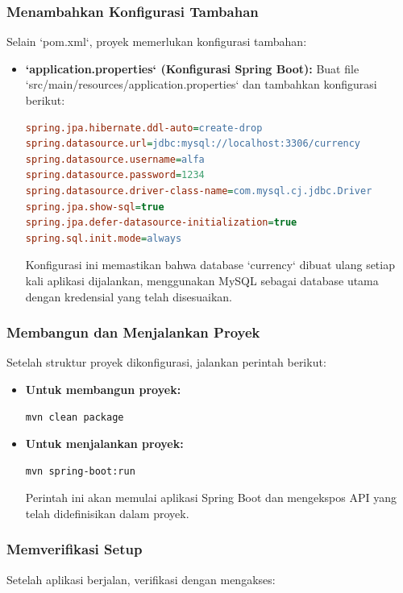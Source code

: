 \subsubsection{Menambahkan Konfigurasi Tambahan}
Selain `pom.xml`, proyek memerlukan konfigurasi tambahan:

\begin{itemize}
\item \textbf{`application.properties` (Konfigurasi Spring Boot):}
Buat file `src/main/resources/application.properties` dan tambahkan konfigurasi berikut:

\begin{lstlisting}[language=ini]
spring.jpa.hibernate.ddl-auto=create-drop
spring.datasource.url=jdbc:mysql://localhost:3306/currency
spring.datasource.username=alfa
spring.datasource.password=1234
spring.datasource.driver-class-name=com.mysql.cj.jdbc.Driver
spring.jpa.show-sql=true
spring.jpa.defer-datasource-initialization=true
spring.sql.init.mode=always
\end{lstlisting}

Konfigurasi ini memastikan bahwa database `currency` dibuat ulang setiap kali aplikasi dijalankan, menggunakan MySQL sebagai database utama dengan kredensial yang telah disesuaikan.
\end{itemize}


\subsubsection{Membangun dan Menjalankan Proyek}
Setelah struktur proyek dikonfigurasi, jalankan perintah berikut:

\begin{itemize}
\item \textbf{Untuk membangun proyek:}
\begin{lstlisting}[language=bash]
mvn clean package
\end{lstlisting}

\item \textbf{Untuk menjalankan proyek:}
\begin{lstlisting}[language=bash]
mvn spring-boot:run
\end{lstlisting}

Perintah ini akan memulai aplikasi Spring Boot dan mengekspos API yang telah didefinisikan dalam proyek.
\end{itemize}

\subsubsection{Memverifikasi Setup}
Setelah aplikasi berjalan, verifikasi dengan mengakses:


